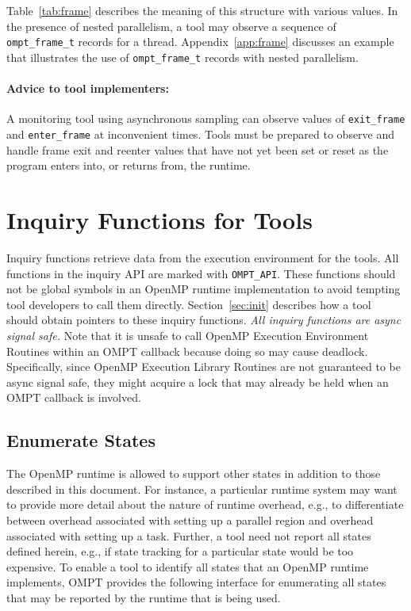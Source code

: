 \documentclass{article}
\begin{document}
\noindent
Table~\ref{tab:frame} describes the meaning of this structure with various values.
In the presence of nested parallelism, a tool may observe a sequence of \lstinline|ompt_frame_t| records for a thread. Appendix~\ref{app:frame} discusses  an example that illustrates the use of \lstinline|ompt_frame_t| records with nested parallelism.

\paragraph{Advice to tool implementers:} A monitoring tool using
      asynchronous sampling can observe values of 
      \lstinline|exit_frame| and \lstinline|enter_frame| at inconvenient times. 
      Tools must be prepared to observe and handle frame exit and reenter values that have not yet been set or reset as the program enters into, or returns from, the runtime. 

\section{Inquiry Functions for Tools}
\label{sec:inquiry}

 Inquiry functions retrieve data from the execution environment for
 the tools. 
 All functions in the inquiry API are marked with \lstinline|OMPT_API|. These functions should not be global symbols in an OpenMP runtime implementation to avoid tempting tool developers to call them directly. Section~\ref{sec:init} describes how a tool should obtain pointers to these inquiry functions.
 {\em All inquiry functions are async signal safe.} 
 Note that it is unsafe to call OpenMP Execution Environment Routines within an OMPT callback because doing so may cause deadlock. 
 Specifically, since OpenMP Execution Library Routines are not guaranteed to be async signal safe, they might acquire a lock that may already be held when an OMPT callback is involved.

 \subsection{Enumerate States}
 \label{ompt_enumerate_states}

 The OpenMP runtime is allowed to support other states in addition to those described in this document.
For instance, a particular runtime system may want to 
provide more detail about the nature of runtime overhead, 
e.g., to differentiate between  overhead associated with setting up a parallel region
and  overhead associated with setting up a task. Further, a tool need not report all states defined herein, e.g., if state tracking for a particular state would be too expensive.
To enable a tool to identify all states that an OpenMP runtime implements, OMPT provides
the following interface for enumerating all states that may be reported by the runtime that is being used.
\end{document}
